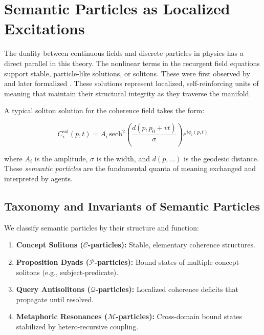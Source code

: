 
\section{Semantic Particles as Localized Excitations}
\label{sec:semantic_particles_as_localized_excitations}

The duality between continuous fields and discrete particles in physics has a direct parallel in this theory. The nonlinear terms in the recurgent field equations support stable, particle-like solutions, or solitons. These were first observed by \autocite{Russell1845} and later formalized \autocite{KortewegdeVries1895, ZabuskyKruskal1965}. These solutions represent localized, self-reinforcing units of meaning that maintain their structural integrity as they traverse the manifold.

A typical soliton solution for the coherence field takes the form:

\begin{equation}
C_i^{\mathrm{sol}}(p, t) = A_i\, \mathrm{sech}^2\left(\frac{d(p, p_0 + vt)}{\sigma}\right) e^{i\phi_i(p, t)}
\end{equation}

where \(A_i\) is the amplitude, \(\sigma\) is the width, and \(d(p, \dots)\) is the geodesic distance. These \textit{semantic particles} are the fundamental quanta of meaning exchanged and interpreted by agents.


\subsection{Taxonomy and Invariants of Semantic Particles}
\label{sec:taxonomy_and_invariants_of_semantic_particles}

We classify semantic particles by their structure and function:

\begin{enumerate}

    \item \textbf{Concept Solitons (\(\mathcal{C}\)-particles):} Stable, elementary coherence structures.

    \item \textbf{Proposition Dyads (\(\mathcal{P}\)-particles):} Bound states of multiple concept solitons (e.g., subject-predicate).

    \item \textbf{Query Antisolitons (\(\mathcal{Q}\)-particles):} Localized coherence deficits that propagate until resolved.

    \item \textbf{Metaphoric Resonances (\(\mathcal{M}\)-particles):} Cross-domain bound states stabilized by hetero-recursive coupling.

\end{enumerate}

